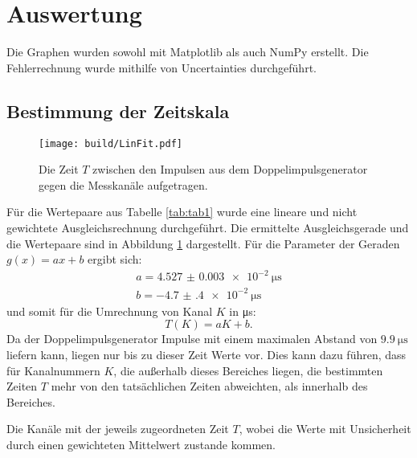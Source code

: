\section{Auswertung}
\label{sec:Auswertung}


Die Graphen wurden sowohl mit Matplotlib \cite{matplotlib} als auch NumPy \cite{numpy} erstellt. Die
Fehlerrechnung wurde mithilfe von Uncertainties \cite{uncertainties} durchgeführt.


\subsection{Bestimmung der Zeitskala}
\begin{figure}
	\centering
	\texttt{[image: build/LinFit.pdf]}
	\caption{Die Zeit $T$ zwischen den Impulsen aus dem Doppelimpulsgenerator gegen die Messkanäle aufgetragen.}
	\label{fig:erste}
\end{figure}

Für die Wertepaare aus Tabelle \ref{tab:tab1}  wurde eine lineare und nicht gewichtete Ausgleichsrechnung durchgeführt. Die ermittelte Ausgleichsgerade und die Wertepaare sind in Abbildung \ref{fig:erste} dargestellt. Für die Parameter der Geraden $g(x)=a x + b$ ergibt sich:
\begin{gather*}
a=\SI{4.527(3)e-2}{\micro\second}\\
b=\SI{-4.7(4)e-2}{\micro\second}
\end{gather*}
und somit für die Umrechnung von Kanal $K$ in \si{\micro\second}:
\begin{equation}
T(K)=a K + b. \label{eq:umrechnung}
\end{equation}
Da der Doppelimpulsgenerator Impulse mit einem maximalen Abstand von $\SI{9.9}{\micro\second}$ liefern kann, liegen nur bis zu dieser Zeit Werte vor. Dies kann dazu führen, dass für Kanalnummern $K$, die außerhalb dieses Bereiches liegen, die bestimmten Zeiten $T$ mehr von den tatsächlichen Zeiten abweichten, als innerhalb des Bereiches.
\begin{table}
	\centering
	\caption{Die Kanäle mit der jeweils zugeordneten Zeit $T$, wobei die Werte mit Unsicherheit durch einen gewichteten Mittelwert zustande kommen.}
	
\end{table}
